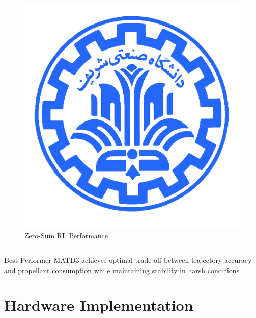 \documentclass[
    11pt, %
    aspectratio=169, %
]{beamer}
\begin{document}
\begin{frame}
\begin{columns}[t]
\begin{column}{0.5\textwidth}
\begin{figure}
				\includegraphics[width=\textwidth]{multi_agent_comparison.png}
				\caption{Zero-Sum RL Performance}
			\end{figure}
		\end{column}
	\end{columns}
	
	\begin{exampleblock}{Best Performer}
		MATD3 achieves optimal trade-off between trajectory accuracy and propellant consumption while maintaining stability in harsh conditions
	\end{exampleblock}
\end{frame}

\section{Hardware Implementation}
\end{document}
